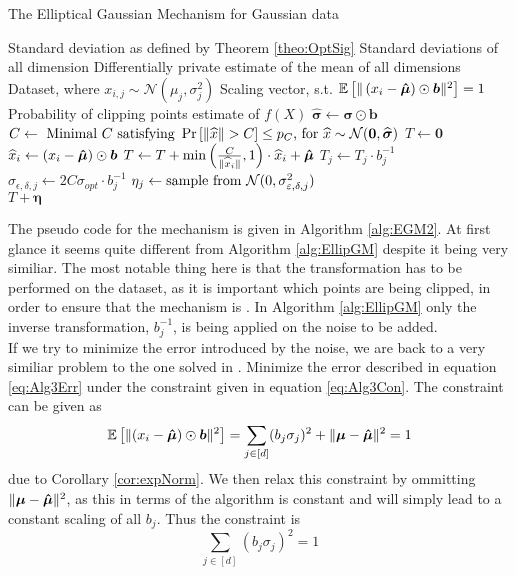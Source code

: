 \documentclass[a4paper,12pt]{article}
\newcommand{\Desc}[2]{\State \makebox[6em][l]{#1}#2}
\begin{document}
\begin{algorithm}
\caption{The Elliptical Gaussian Mechanism for Gaussian data}\label{alg:EGM2}
\begin{algorithmic}
    \Input
    \Desc{$\sigma_{opt} \in \R$}{Standard deviation as defined by Theorem \ref{theo:OptSig}}
    \Desc{$\bm{\sigma} \in \R^{d}$}{Standard deviations of all dimension}
    \Desc{$\bm{\hat{\mu}} \in \R^{d}$}{Differentially private estimate of the mean of all dimensions}
    \Desc{$X \in \R^{n \times d}$}{Dataset, where $x_{i,j} \sim \mathcal{N}(\mu_j,\sigma_j^2)$}
    \Desc{$\bm{b} \in \R^{d}$}{Scaling vector, s.t. $\ee{\lr{x_i - \bm{\hat{\mu}}} \odot \bm{b}} = 1$}
    \Desc{$p_C \in \R$}{Probability of clipping points}
    \EndInput
    \Output
    \State \edp estimate of $f(X)$
    \EndOutput
    \State $\widehat{\bm{\sigma}} \gets \bm{\sigma} \odot \bm{b}$
    \State $C \gets \textnormal{ Minimal $C$ satisfying } \prob{\|\widehat{x}\| > C} \le p_C \textnormal{, for } \widehat{x} \sim \mathcal{N}(\bm{0},\widehat{\bm{\sigma}})$
    \State $T \gets \bm{0}$
        \State $\widehat{x}_i \gets \lr{x_i - \bm{\hat{\mu}}} \odot \bm{b}$
        \State $T \gets T + \min \lr{\frac{C}{\|\widehat{x}_i\|}, 1} \cdot \widehat{x}_i + \bm{\hat{\mu}}$
    \EndFor
        \State $T_j \gets T_j \cdot b_j^{-1}$
        \State $\sigma_{\epsilon, \delta, j} \gets 2C\sigma_{opt} \cdot b_j^{-1}$
        \State $\eta_j \gets \textnormal{sample from } \mathcal{N}(0, \sigma_{\epsilon, \delta, j}^2)$
    \EndFor \\
    \Return $T + \bm{\eta}$
\end{algorithmic}
\end{algorithm}

The pseudo code for the mechanism is given in Algorithm \ref{alg:EGM2}. At first glance it seems quite different from Algorithm \ref{alg:EllipGM}
despite it being very similiar. The most notable thing here
is that the transformation has to be performed on the dataset,
as it is important which points are being clipped, in order to ensure that the mechanism is \edp.
In Algorithm \ref{alg:EllipGM} only the inverse transformation, $b_j^{-1}$, is being
applied on the noise to be added. \\

\noindent If we try to minimize the error introduced by the noise, we are back to a very similiar problem to the one solved in \cite{Lebeda2022}. 
Minimize the error described in equation \eqref{eq:Alg3Err}
under the constraint given in equation \eqref{eq:Alg3Con}.
The constraint can be given as
\begin{equation*}
    \ee{(x_i - \mue) \odot \bm{b}} = \sum_{j \in [d]} (b_j\sigma_j)^2 + \| \bm{\mu} - \mue \|^2 = 1
\end{equation*}
due to Corollary \ref{cor:expNorm}. We then relax this constraint by ommitting $\| \bm{\mu} - \mue \|^2$, 
as this in terms of the algorithm is constant and will simply lead to a constant scaling of all $b_j$.
Thus the constraint is
\begin{equation}
\label{eq:normcon}
\sum_{j \in [d]} (b_j\sigma_j)^2 = 1
\end{equation}
\end{document}
